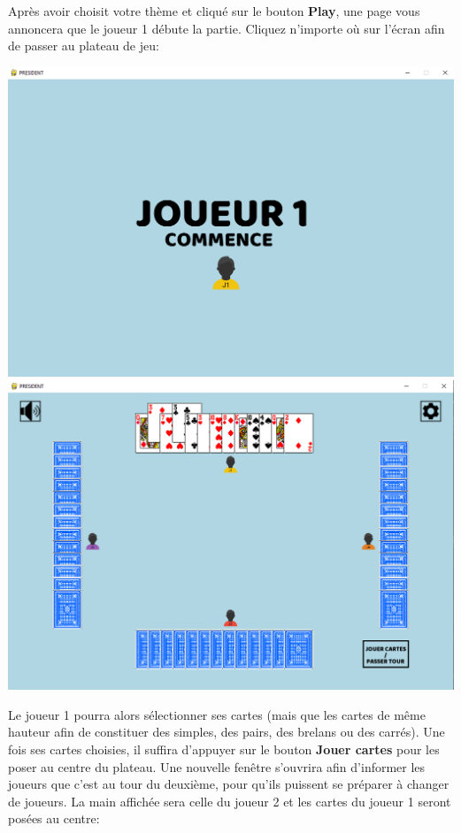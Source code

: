 \documentclass[french,12pt]{article}
\begin{document}
Après avoir choisit votre thème et cliqué sur le bouton \textbf{Play}, une page vous annoncera que le joueur 1 débute la partie. Cliquez n'importe où sur l'écran afin de passer au plateau de jeu:

\begin{center}
	\includegraphics[scale=0.3]{img/joueur1.png}\\
	\includegraphics[scale=0.3]{img/jeu.png}
\end{center}

Le joueur 1 pourra alors sélectionner ses cartes (mais que les cartes de même hauteur afin de constituer des simples, des pairs, des brelans ou des carrés). Une fois ses cartes choisies, il suffira d'appuyer sur le bouton \textbf{Jouer cartes} pour les poser au centre du plateau. Une nouvelle fenêtre s'ouvrira afin d'informer les joueurs que c'est au tour du deuxième, pour qu'ils puissent se préparer à changer de joueurs.
La main affichée sera celle du joueur 2 et les cartes du joueur 1 seront posées au centre:
\end{document}
